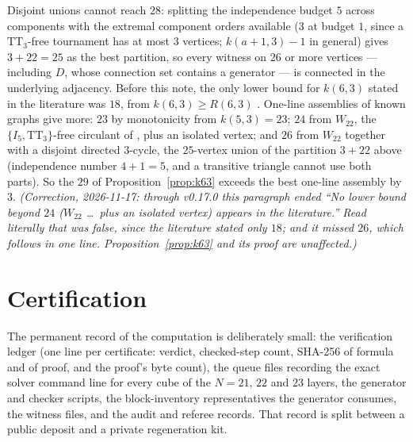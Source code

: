 \documentclass[11pt]{amsart}
\newcommand{\TT}[1]{\mathrm{TT}_{#1}}
\newcommand{\I}[1]{I_{#1}}
\theoremstyle{plain}
\theoremstyle{definition}
\theoremstyle{remark}
\begin{document}
Disjoint unions cannot reach $28$: splitting the independence budget
$5$ across components with the extremal component orders available
($3$ at budget $1$, since a $\TT3$-free tournament has at most $3$
vertices; $k(a{+}1,3)-1$ in general) gives $3+22=25$ as the best
partition, so every witness on $26$ or more vertices --- including
$D$, whose connection set contains a generator --- is connected in the
underlying adjacency. Before this note, the only lower bound for $k(6,3)$
stated in the literature was $18$, from $k(6,3)\ge R(6,3)$
\cite[\S1]{IRW21}. One-line assemblies of known graphs give more: $23$ by
monotonicity from $k(5,3)=23$; $24$ from $W_{22}$, the
$\{\I5,\TT{3}\}$-free circulant of \cite[Observation~4.2]{IRW21}, plus
an isolated vertex; and $26$ from $W_{22}$ together with a disjoint
directed $3$-cycle, the $25$-vertex union of the partition $3+22$ above
(independence number $4+1=5$, and a transitive triangle cannot use both
parts). So the $29$ of Proposition~\ref{prop:k63} exceeds the best
one-line assembly by $3$. \emph{(Correction, 2026-11-17: through v0.17.0
this paragraph ended ``No lower bound beyond $24$ ($W_{22}$ \dots\ plus
an isolated vertex) appears in the literature.'' Read literally that was
false, since the literature stated only $18$; and it missed $26$, which
follows in one line. Proposition~\ref{prop:k63} and its proof are unaffected.)}

\section{Certification}\label{sec:certification}

The permanent record of the computation is deliberately small: the
verification ledger (one line per certificate: verdict, checked-step
count, SHA-256 of formula and of proof, and the proof's byte count), the
queue files recording the exact solver command line for every cube of
the $N=21$, $22$ and $23$ layers, the generator and checker scripts, the
block-inventory representatives the generator consumes, the witness
files, and the audit and referee
records. That record is split between a public deposit and a private
regeneration kit.
\end{document}
